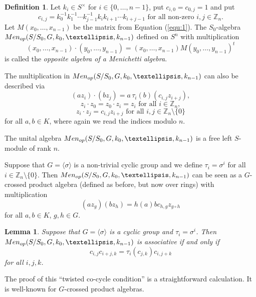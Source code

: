 \documentclass[11pt]{amsart}
\theoremstyle{plain}
\newtheorem{lemma}[theorem]{Lemma}
\theoremstyle{definition}
\newtheorem{definition}[theorem]{Definition}
\begin{document}
\begin{definition}
 Let  $k_i\in S^\times$ for $i\in\{0,\dots,n-1\}$,  put $c_{i,0}=c_{0,j}=1$ and put
$$c_{i,j}=k_0^{-1}k_1^{-1} \cdots    k_{j-1}^{-1}   k_ik_{i+1}\cdots k_{i+j-1} \text{ for all non-zero } i,j\in \mathbb{Z}_n.$$
Let $M(x_0,\dots,x_{n-1})$ be the matrix from Equation (\ref{equ:1}).
 The $S_0$-algebra ${\rm Men}_{op}(S/S_0,G, k_0,\dots,k_{n-1})$ defined on $S^n$ with multiplication
 $$(x_0,\dots,x_{n-1})\cdot  (y_0,\dots,y_{n-1})=(x_0,\dots,x_{n-1})M(y_0,\dots,y_{n-1})^t$$
 is called the  \emph{opposite algebra of a Menichetti algebra}.
\end{definition}

The multiplication in ${\rm Men}_{op}(S/S_0,G, k_0,\dots,k_{n-1})$ can also be described via
$$ (az_i)\cdot(bz_j)=a\,\tau_i(b)(c_{i,j} z_{i+j}),$$
$$z_i\cdot  z_0=z_0\cdot  z_i =z_i \text{ for all } i\in\mathbb{Z}_n,$$
$$z_i\cdot  z_j=c_{i,j}z_{i+j} \text{ for all } i,j\in\mathbb{Z}_n\setminus \{0\}$$
for all $a,b\in K$, where again we read the indices modulo $n$.


The unital algebra ${\rm Men}_{op}(S/S_0,G, k_0,\dots,k_{n-1})$ is a free left $S$-module of rank $n$.

Suppose that $G=\langle \sigma\rangle$ is a non-trivial cyclic group and we define $\tau_i=\sigma^i$ for all $ i\in\mathbb{Z}_n\setminus \{0\}$. Then ${\rm Men}_{op}(S/S_0,G, k_0,\dots,k_{n-1})$ can be seen as a $G$-crossed product algebra (defined as before, but now over rings) with multiplication
$$(az_g)(b z_h)=h(a) b c_{h,g} z_{g\circ h}$$
for all $a, b\in K$, $g,h\in G$.

\begin{lemma}
Suppose that $G=\langle \sigma\rangle$ is a cyclic group and $\tau_i=\sigma^i$. Then  ${\rm Men}_{op}(S/S_0,G, k_0,\dots,k_{n-1})$ is associative if and only if
 $$c_{i,j}c_{i+j,k}=\tau_i(c_{j,k})c_{i,j+k}$$
 for all $i,j,k$.
\end{lemma}

The proof of this ``twisted co-cycle condition'' is a straightforward calculation. It is well-known for $G$-crossed product algebras.
\end{document}
